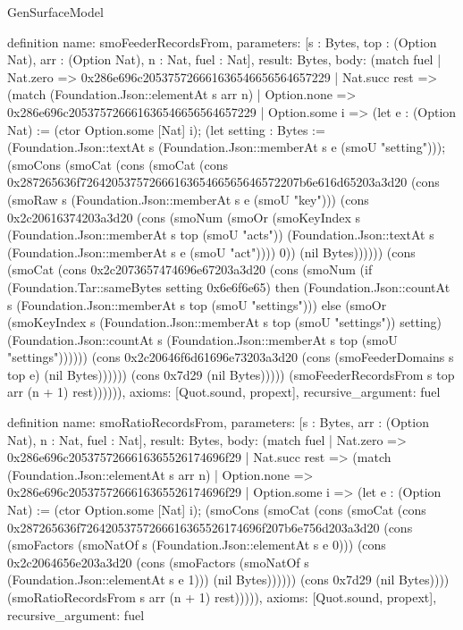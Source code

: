 \begin{lexlean}{GenSurfaceModel}
\begin{semanticmodule}
definition{
  name: smoFeederRecordsFrom,
  parameters: [s : Bytes, top : (Option Nat), arr : (Option Nat), n : Nat, fuel : Nat],
  result: Bytes,
  body: (match fuel
    | Nat.zero => 0x286e696c205375726661636546656564657229
    | Nat.succ rest => (match (Foundation.Json::elementAt s arr n)
      | Option.none => 0x286e696c205375726661636546656564657229
      | Option.some i => (let e : (Option Nat) := (ctor Option.some [Nat] i); (let setting : Bytes := (Foundation.Json::textAt s (Foundation.Json::memberAt s e (smoU "setting"))); (smoCons (smoCat (cons (smoCat (cons 0x287265636f72642053757266616365466565646572207b6e616d65203a3d20 (cons (smoRaw s (Foundation.Json::memberAt s e (smoU "key"))) (cons 0x2c20616374203a3d20 (cons (smoNum (smoOr (smoKeyIndex s (Foundation.Json::memberAt s top (smoU "acts")) (Foundation.Json::textAt s (Foundation.Json::memberAt s e (smoU "act")))) 0)) (nil Bytes)))))) (cons (smoCat (cons 0x2c2073657474696e67203a3d20 (cons (smoNum (if (Foundation.Tar::sameBytes setting 0x6e6f6e65) then (Foundation.Json::countAt s (Foundation.Json::memberAt s top (smoU "settings"))) else (smoOr (smoKeyIndex s (Foundation.Json::memberAt s top (smoU "settings")) setting) (Foundation.Json::countAt s (Foundation.Json::memberAt s top (smoU "settings")))))) (cons 0x2c20646f6d61696e73203a3d20 (cons (smoFeederDomains s top e) (nil Bytes)))))) (cons 0x7d29 (nil Bytes))))) (smoFeederRecordsFrom s top arr (n + 1) rest)))))),
  axioms: [Quot.sound, propext],
  recursive_argument: fuel
}

definition{
  name: smoRatioRecordsFrom,
  parameters: [s : Bytes, arr : (Option Nat), n : Nat, fuel : Nat],
  result: Bytes,
  body: (match fuel
    | Nat.zero => 0x286e696c2053757266616365526174696f29
    | Nat.succ rest => (match (Foundation.Json::elementAt s arr n)
      | Option.none => 0x286e696c2053757266616365526174696f29
      | Option.some i => (let e : (Option Nat) := (ctor Option.some [Nat] i); (smoCons (smoCat (cons (smoCat (cons 0x287265636f72642053757266616365526174696f207b6e756d203a3d20 (cons (smoFactors (smoNatOf s (Foundation.Json::elementAt s e 0))) (cons 0x2c2064656e203a3d20 (cons (smoFactors (smoNatOf s (Foundation.Json::elementAt s e 1))) (nil Bytes)))))) (cons 0x7d29 (nil Bytes)))) (smoRatioRecordsFrom s arr (n + 1) rest))))),
  axioms: [Quot.sound, propext],
  recursive_argument: fuel
}


\end{semanticmodule}
\end{lexlean}
